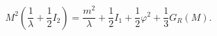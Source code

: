 \begin{equation}
M^{2}\left(\frac{1}{\lambda} + \frac{1}{2} I_{2}
\right)=\frac{m^{2}}{\lambda} +
\frac{1}{2}I_{1}+\frac{1}{2}\varphi^{2}+\frac{1}{3} G_{R}(M).
\end{equation}

